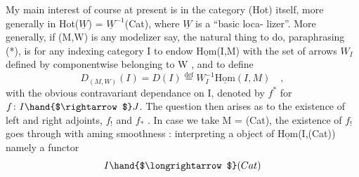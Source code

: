 My main interest of course at present is in the category (Hot)
itself,  more generally in Hot($\underline{W}$) = $\underline{W}^{-1}$(Cat),  where $\underline{W}$ is a ``basic loca-%
lizer''.  More generally,  if (M,W)  is any modelizer say,  the natural
thing to do,  paraphrasing (*),  is for any indexing category I to
endow  $\underline{\mathrm{Hom}}$(I,M)  with the set of arrows $W_I$  defined by componentwise
belonging to W ,  and to define
\[ D_{(M,W)}(I) = D(I) \overset{\mathrm{def}}{=} W_I^{-1}\underline{\mathrm{Hom}}(I,M) \quad , \]
with the obvious contravariant dependance on I,  denoted by $f^*$  for
$f\colon I \hand{$\rightarrow$} J$.  The question  then arises as to the existence of left and
right adjoints,  $f_!$  and $f_*$ .  In case we take M = (Cat),  the existence
of  $f_!$  goes through with aming smoothness :  interpreting a object
of  $\underline{\mathrm{Hom}}$(I,(Cat))   namely a functor
\[ I \hand{$\longrightarrow$} (Cat) \]


